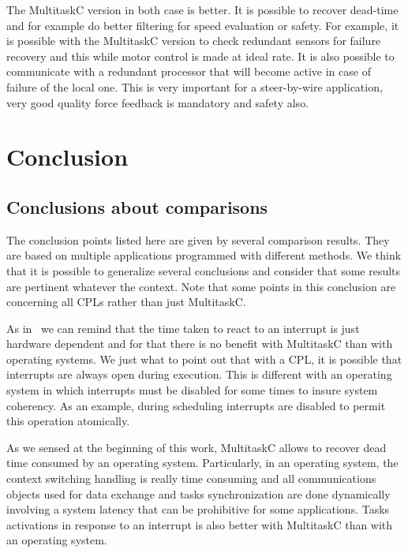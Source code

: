 \documentclass[10pt]{report}
\begin{document}
The MultitaskC version in both case is better. It is possible to recover dead-time and for example do better
filtering for speed evaluation or safety. For example, it is possible with the MultitaskC version to
check redundant sensors for failure recovery and this while motor control is made at ideal rate. It is
also possible to communicate with a redundant processor that will become active in case of failure
of the local one. This is very important for a steer-by-wire application, very good quality force feedback
is mandatory and safety also.

\chapter{Conclusion}
\label{sec:conclusion}

\section{Conclusions about comparisons}

The conclusion points listed here are given by several comparison results. They are based on multiple applications
programmed with different methods. We think that it is possible to generalize several conclusions and consider that
some results are pertinent whatever the context. Note that some points in this conclusion are concerning all
CPLs rather than just MultitaskC.

As in~\cite{Delchini:95} we can remind that the time taken to react to an interrupt is just hardware dependent
and for that there is no benefit with MultitaskC than with operating systems. We just what to point out that
with a CPL, it is possible that interrupts are always open during execution. This is different with an operating system
in which interrupts must be disabled for some times to insure system coherency. As an example, during scheduling
interrupts are disabled to permit this operation atomically.

As we sensed at the beginning of this work, MultitaskC allows to recover dead time consumed by an operating system.
Particularly, in an operating system, the context switching handling is really time consuming and all communications
objects used for data exchange and tasks synchronization are done dynamically involving a system latency that can
be prohibitive for some applications. Tasks activations in response to an interrupt is also better with MultitaskC
than with an operating system.
\end{document}
